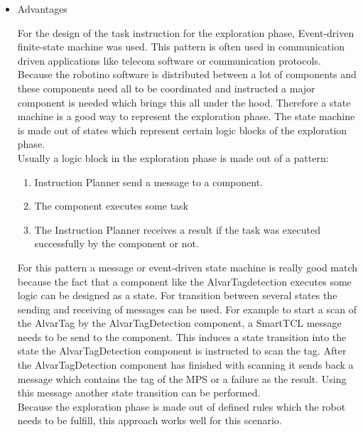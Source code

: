 \begin{itemize}

\item Advantages

For the design of the task instruction for the exploration phase, Event-driven finite-state machine was used. This pattern is often used in communication driven applications
like telecom software or communication protocols. Because the robotino software is distributed between a lot of components and these components need all to be coordinated and instructed a major component is needed which brings this all under the hood. Therefore a state machine is a good way to represent the exploration phase. The state machine is made out of states which represent certain logic blocks of the exploration phase. \\


Usually a logic block in the exploration phase is made out of a pattern:

\begin{enumerate}

\item Instruction Planner send a message to a component.

\item The component executes some task

\item The Instruction Planner receives a result if the task was executed successfully by the 
component or not.  


\end{enumerate}

For this pattern a message or event-driven state machine is really good match because the fact that a component like the AlvarTagdetection executes some logic can be designed as a state. For transition between several states the sending and receiving of messages can be used. For example to start a scan of the AlvarTag by the AlvarTagDetection component, a SmartTCL message needs to be send to the component. This induces a state transition into the state the AlvarTagDetection component is instructed to scan the tag. After the AlvarTagDetection component has finished with scanning it sends back a message which contains the tag of the MPS or a failure as the result. Using this message another state transition can be performed. \\

Because the exploration phase is made out of defined rules which the robot needs to be fulfill, this approach works well for this scenario. 



\end{itemize}
